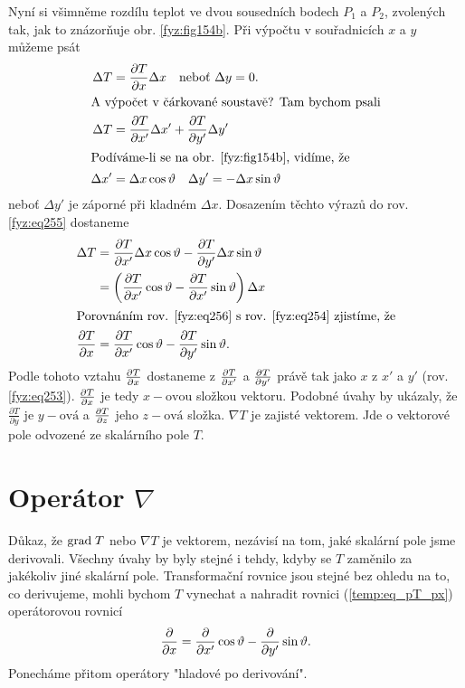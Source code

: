 {    Nyní si všimněme rozdílu teplot ve dvou sousedních bodech $P_1$ a $P_2$, zvolených tak, jak to
    znázorňuje obr. \ref{fyz:fig154b}. Při výpočtu v souřadnicích $x$ a $y$ můžeme psát
    \begin{align}
      \Delta T  &= \frac{\partial T}{\partial x}\Delta x \quad
                   \text{neboť } \Delta y=0.   \label{fyz:eq254} \\ 
      \shortintertext{A výpočet v čárkované soustavě? Tam bychom psali}
      \Delta T  &= \frac{\partial T}{\partial x'}\Delta x' +
                   \frac{\partial T}{\partial y'}\Delta y'      \label{fyz:eq255}   \\
      \shortintertext{Podíváme-li se na obr. \ref{fyz:fig154b}, vidíme, že}
      \Delta x' &=  \Delta x\cos\vartheta \quad \Delta y' = -\Delta x\sin\vartheta
    \end{align}
    neboť $\Delta y'$ je záporné při kladném $\Delta x$. Dosazením těchto výrazů do rov.    
    \ref{fyz:eq255} dostaneme
    \begin{align}
      \Delta T    &=  \frac{\partial T}{\partial x'}\Delta x\cos\vartheta
                     -\frac{\partial T}{\partial y'}\Delta x\sin\vartheta  \nonumber  \\
                  &=  \left(\frac{\partial T}{\partial x'}\cos\vartheta   -
                      \frac{\partial T}{\partial x'}\sin\vartheta\right)\Delta x  \label{fyz:eq256} \\
      \shortintertext{Porovnáním rov. \ref{fyz:eq256} s rov.   
                      \ref{fyz:eq254} zjistíme, že}
      \frac{\partial T}{\partial x} &=  \frac{\partial T}{\partial x'}\cos\vartheta - \frac{\partial T}{\partial y'}\sin\vartheta. \label{temp:eq_pT_px}
    \end{align}
    Podle tohoto vztahu $\frac{\partial T}{\partial x}$ dostaneme z $\frac{\partial T}{\partial x'}$ a $\frac{\partial T}{\partial y'}$ právě tak jako 
    $x$ z $x'$ a $y'$ (rov. \ref{fyz:eq253}). $\frac{\partial T}{\partial x}$ je tedy $x-\text{ovou}$ složkou 
    vektoru. Podobné úvahy by ukázaly, že $\frac{\partial T}{\partial y}$ je $y-\text{ová}$ a 
    $\frac{\partial T}{\partial z}$ jeho $z-\text{ová}$ složka. $\nabla T$ je zajisté vektorem. Jde o vektorové pole 
    odvozené ze skalárního pole $T$.
       
  \section{Operátor \texorpdfstring{\fontsize{16pt}{17pt}\selectfont\(\nabla\)}{nabla}}
    Důkaz, že $\mathrm{grad\;}T$ nebo $\nabla T$ je vektorem, nezávisí na tom, jaké skalární pole jsme 
    derivovali. Všechny úvahy by byly stejné i tehdy, kdyby se $T$ zaměnilo za jakékoliv jiné 
    skalární pole. Transformační rovnice jsou stejné bez ohledu na to, co derivujeme, mohli bychom 
    $T$ vynechat a nahradit rovnici (\ref{temp:eq_pT_px}) operátorovou rovnicí
    \begin{equation}\label{temp:eq_operatorova_rce}
      \frac{\partial  }{\partial x}=\frac{\partial  }{\partial x'}\cos\vartheta - \frac{\partial  }{\partial y'}\sin\vartheta.
    \end{equation}
    Ponecháme přitom operátory "hladové po derivování".

}
